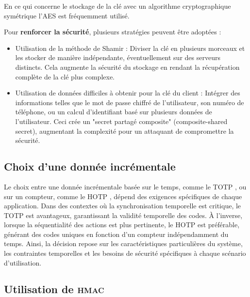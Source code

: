 \documentclass[a4paper, 10pt]{article}
\newcommand{\totp}{\textsc{TOTP} }
\newcommand{\hotp}{\textsc{HOTP} }
\newcommand{\hmac}{\textsc{hmac} }
\begin{document}
En ce qui concerne le \textcolor{myblue}{stockage de la clé} avec un algorithme cryptographique symétrique l'\textcolor{mygreen}{AES} est fréquemment utilisé.

\noindent
Pour \textbf{renforcer la sécurité}, plusieurs stratégies peuvent être adoptées :

\begin{itemize}
    \item Utilisation de la \textcolor{myblue}{méthode de Shamir} : Diviser la clé en plusieurs morceaux et les stocker de manière indépendante, éventuellement sur des serveurs distincts. Cela augmente la sécurité du stockage en rendant la récupération complète de la clé plus complexe.

    \item Utilisation de \textcolor{myblue}{données difficiles à obtenir} pour la clé du client : Intégrer des informations telles que le \textcolor{mygreen}{mot de passe chiffré de l'utilisateur}, son numéro de téléphone, ou un calcul d'identifiant basé sur plusieurs données de l'utilisateur. Ceci crée un "secret partagé composite" (composite-shared secret), augmentant la complexité pour un attaquant de compromettre la sécurité.
\end{itemize}

    
    \subsection{Choix d'une donnée incrémentale}

    Le choix entre une donnée incrémentale \textcolor{mygreen}{basée sur le temps}, comme le \totp, ou sur \textcolor{mygreen}{un compteur}, comme le \hotp, dépend des exigences spécifiques de chaque application. 
Dans des contextes où la \textcolor{myblue}{synchronisation temporelle est critique}, le \textcolor{mygreen}{\totp} est avantageux, garantissant la validité temporelle des codes. 
À l'inverse, lorsque \textcolor{myblue}{la séquentialité des actions est plus pertinente}, le \textcolor{mygreen}{\hotp} est préférable, générant des codes uniques en fonction d'un compteur indépendamment du temps. Ainsi, la décision repose sur les caractéristiques particulières du système, les contraintes temporelles et \textcolor{myblue}{les besoins de sécurité spécifiques à chaque scénario d'utilisation}.



    \subsection{Utilisation de \hmac}
\end{document}
